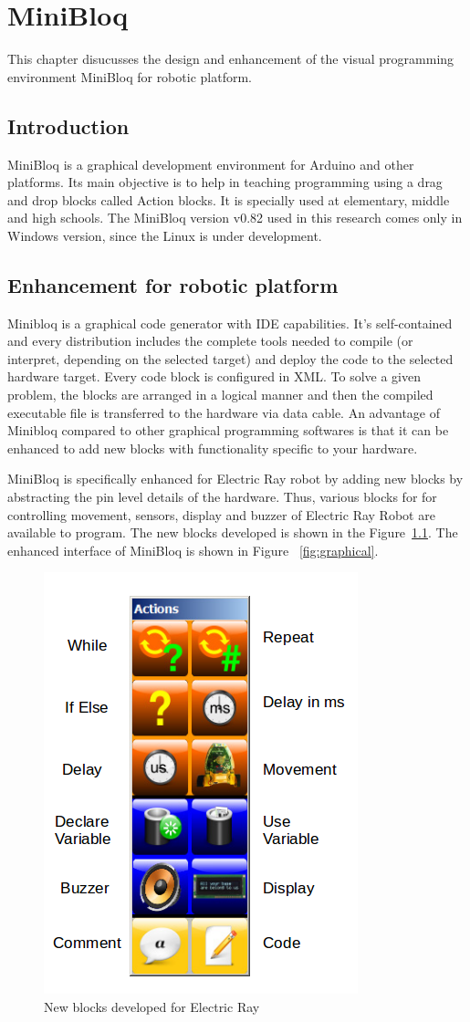 
\chapter{MiniBloq}\label{chap:minibloq}
This chapter disucusses the design and enhancement of the visual programming environment MiniBloq for robotic platform.

\section{Introduction}
MiniBloq is a graphical development environment for Arduino and other platforms. Its main objective is to help in teaching programming using a drag and drop blocks called Action blocks. It is specially used at elementary, middle and high schools. The MiniBloq version v0.82 used in this research comes only in Windows version, since the Linux is under development.

\section{Enhancement for robotic platform}
Minibloq is a graphical code generator with IDE capabilities. It's self-contained and every distribution includes the complete tools needed to compile (or interpret, depending on the selected target) and deploy the code to the selected hardware target. Every code block is configured in XML. To solve a given problem, the blocks are arranged in a logical manner and then the compiled executable file is transferred to the hardware via data cable. An advantage of Minibloq compared to other graphical programming softwares is that it can be enhanced to add new blocks with functionality specific to your hardware.

MiniBloq is specifically enhanced for Electric Ray robot by adding new blocks by abstracting the pin level details of the hardware. Thus, various blocks for for controlling movement, sensors, display and buzzer of Electric Ray Robot are available to program. The new blocks developed is shown in the Figure~\ref{fig:blocks}. The enhanced interface of MiniBloq is shown in Figure ~\ref{fig:graphical}.

\begin{figure}[h]
\centering
\includegraphics[width=0.45\columnwidth]{Images/minibloq-blocks}
\caption{New blocks developed for Electric Ray}
\label{fig:blocks}
\end{figure}

